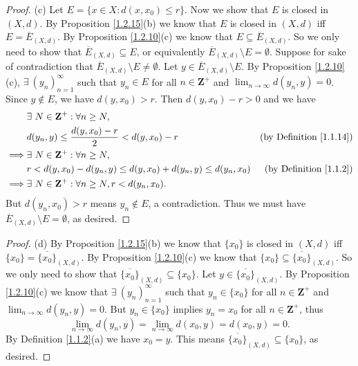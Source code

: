 \begin{proof}{(c)}
    Let \(E = \{x \in X : d(x, x_0) \leq r\}\).
    Now we show that \(E\) is closed in \((X, d)\).
    By Proposition \ref{1.2.15}(b) we know that \(E\) is closed in \((X, d)\) iff \(E = \overline{E}_{(X, d)}\).
    By Proposition \ref{1.2.10}(c) we know that \(E \subseteq \overline{E}_{(X, d)}\).
    So we only need to show that \(\overline{E}_{(X, d)} \subseteq E\), or equivalently \(\overline{E}_{(X, d)} \setminus E = \emptyset\).
    Suppose for sake of contradiction that \(\overline{E}_{(X, d)} \setminus E \neq \emptyset\).
    Let \(y \in \overline{E}_{(X, d)} \setminus E\).
    By Proposition \ref{1.2.10}(c), \(\exists\ (y_n)_{n = 1}^\infty\) such that \(y_n \in E\) for all \(n \in \mathbf{Z}^+\) and \(\lim_{n \to \infty} d(y_n, y) = 0\).
    Since \(y \notin E\), we have \(d(y, x_0) > r\).
    Then \(d(y, x_0) - r > 0\) and we have
    \begin{align*}
                 & \exists\ N \in \mathbf{Z}^+ : \forall n \geq N,                                                             \\
                 & d(y_n, y) \leq \frac{d(y, x_0) - r}{2} < d(y, x_0) - r                & \text{(by Definition \ref{1.1.14})} \\
        \implies & \exists\ N \in \mathbf{Z}^+ : \forall n \geq N,                                                             \\
                 & r < d(y, x_0) - d(y_n, y) \leq d(y, x_0) + d(y_n, y) \leq d(y_n, x_0) & \text{(by Definition \ref{1.1.2})}  \\
        \implies & \exists\ N \in \mathbf{Z}^+ : \forall n \geq N, r < d(y_n, x_0).
    \end{align*}
    But \(d(y_n, x_0) > r\) means \(y_n \notin E\), a contradiction.
    Thus we must have \(\overline{E}_{(X, d)} \setminus E = \emptyset\), as desired.
\end{proof}

\begin{proof}{(d)}
    By Proposition \ref{1.2.15}(b) we know that \(\{x_0\}\) is closed in \((X, d)\) iff \(\{x_0\} = \overline{\{x_0\}}_{(X, d)}\).
    By Proposition \ref{1.2.10}(c) we know that \(\{x_0\} \subseteq \overline{\{x_0\}}_{(X, d)}\).
    So we only need to show that \(\overline{\{x_0\}}_{(X, d)} \subseteq \{x_0\}\).
    Let \(y \in \overline{\{x_0\}}_{(X, d)}\).
    By Proposition \ref{1.2.10}(c) we know that \(\exists\ (y_n)_{n = 1}^\infty\) such that \(y_n \in \{x_0\}\) for all \(n \in \mathbf{Z}^+\) and \(\lim_{n \to \infty} d(y_n, y) = 0\).
    But \(y_n \in \{x_0\}\) implies \(y_n = x_0\) for all \(n \in \mathbf{Z}^+\), thus
    \[
        \lim_{n \to \infty} d(y_n, y) = \lim_{n \to \infty} d(x_0, y) = d(x_0, y) = 0.
    \]
    By Definition \ref{1.1.2}(a) we have \(x_0 = y\).
    This means \(\overline{\{x_0\}}_{(X, d)} \subseteq \{x_0\}\), as desired.
\end{proof}

